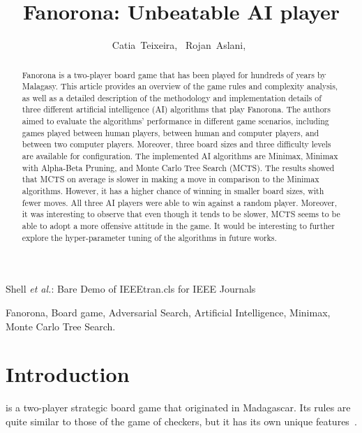 \documentclass[journal]{IEEEtran}
\begin{document}
\title{Fanorona: Unbeatable AI player}

\author{Catia~Teixeira,~
        Rojan~Aslani,~}%


{Shell \MakeLowercase{\textit{et al.}}: Bare Demo of IEEEtran.cls for IEEE Journals}

\maketitle

\begin{abstract}
Fanorona is a two-player board game that has been played for hundreds of years by Malagasy. This article provides an overview of the game rules and complexity analysis, as well as a detailed description of the methodology and implementation details of three different artificial intelligence (AI) algorithms that play Fanorona. The authors aimed to evaluate the algorithms' performance in different game scenarios, including games played between human players, between human and computer players, and between two computer players. Moreover, three board sizes and three difficulty levels are available for configuration. The implemented AI algorithms are Minimax, Minimax with Alpha-Beta Pruning, and Monte Carlo Tree Search (MCTS). The results showed that MCTS on average is slower in making a move in comparison to the Minimax algorithms. However, it has a higher chance of winning in smaller board sizes, with fewer moves. All three AI players were able to win against a random player. Moreover, it was interesting to observe that even though it tends to be slower, MCTS seems to be able to adopt a more offensive attitude in the game. It would be interesting to further explore the hyper-parameter tuning of the algorithms in future works.

\end{abstract}

\begin{IEEEkeywords}
Fanorona, Board game, Adversarial Search, Artificial Intelligence, Minimax, Monte Carlo Tree Search.
\end{IEEEkeywords}

\IEEEpeerreviewmaketitle

\section{Introduction}
 is a two-player strategic board game that originated in Madagascar. Its rules are quite similar to those of the game of checkers, but it has its own unique features~\cite{gen2012}.
\end{document}
